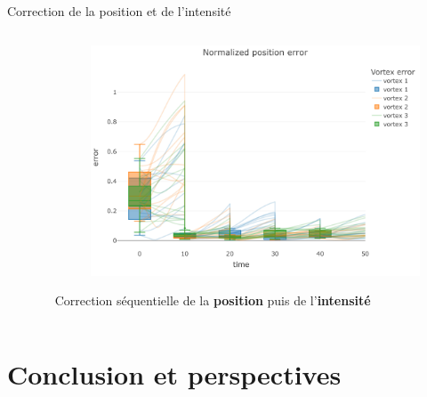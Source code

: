\documentclass[aspectratio=169]{beamer} %
\begin{document}
\begin{frame}{Correction de la position et de l'intensité}
    \vspace{-0.5cm}
    \begin{columns}
        \begin{column}{0.5\textwidth}
            \begin{figure}
                \centering
            \end{figure}
        \end{column}
        \begin{column}{0.5\textwidth}
            \begin{figure}
                \centering
                \includegraphics[width=\textwidth]{../../conference/images/align_part_error.pdf}
            \end{figure}

            Correction séquentielle de la \textbf{position} puis de l'\textbf{intensité}
        \end{column}
    \end{columns}
\end{frame}
\section{Conclusion et perspectives}
\end{document}
